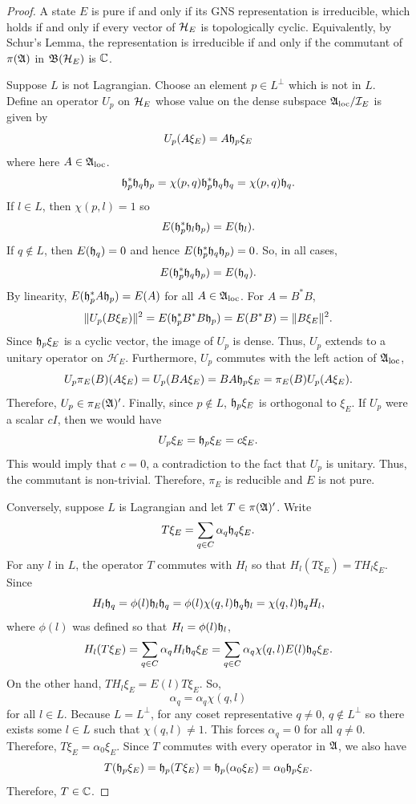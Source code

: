 \documentclass[11pt]{amsart}
\begin{document}
\begin{proof}
A state $E$ is pure if and only if its GNS representation is irreducible, which holds if and only if every vector of $\mathcal{H}_E$ is topologically cyclic. Equivalently, by Schur's Lemma, the representation is irreducible if and only if the commutant of $\pi(\mathfrak{A})$ in $\mathfrak{B}(\mathcal{H}_E)$ is $\mathbb{C}$.


Suppose $L$ is not Lagrangian. Choose an element $p \in L^\perp$ which is not in $L$. Define an operator $U_p$ on $\mathcal{H}_E$ whose value on the dense subspace $\mathfrak{A}_{\mathrm{loc}}/\mathcal{I}_E$ is given by
\[
U_p (A \xi_E) = A \mathfrak{h}_p \xi_E
\]
where here $A \in \mathfrak{A}_{\mathrm{loc}}$.
\[\mathfrak{h}_p^* \mathfrak{h}_q \mathfrak{h}_p = \chi(p, q) \mathfrak{h}_p^*\mathfrak{h}_q\mathfrak{h}_q = \chi(p, q)\mathfrak{h}_q .\]
If $l\in L$, then $ \chi(p, l)=1$ so
\[E(\mathfrak{h}_p^* \mathfrak{h}_l \mathfrak{h}_p  )=E(\mathfrak{h}_l).\]
If $q\not\in L$, then $ E(\mathfrak{h}_q)= 0$ and hence
$E(\mathfrak{h}_p^* \mathfrak{h}_q \mathfrak{h}_p )  = 0$.
So, in all cases,
\[ E(\mathfrak{h}_p^* \mathfrak{h}_q \mathfrak{h}_p) = E(\mathfrak{h}_q).\]
By linearity, $E(\mathfrak{h}_p^* A \mathfrak{h}_p) = E(A)$ for all $A\in \mathfrak{A}_{\mathrm{loc}}$. For $A = B^* B$,
\[
\lVert U_p (B \xi_E) \rVert^2 = E(\mathfrak{h}_p^* B^* B \mathfrak{h}_p) = E(B^* B) = \lVert B \xi_E \rVert^2.
\]
Since $\mathfrak{h}_p \xi_E$ is a cyclic vector, the image of $U_p$ is dense.
Thus, $U_p$ extends to a unitary operator on $\mathcal{H}_E$.
Furthermore, $U_p$ commutes with the left action of $\mathfrak{A}_{\mathrm{loc}}$,
\[
U_p \pi_E(B) (A \xi_E) = U_p (B A \xi_E) = B A \mathfrak{h}_p \xi_E = \pi_E(B) U_p (A \xi_E).
\]
Therefore, $U_p \in \pi_E(\mathfrak{A})'$. Finally, since $p \notin L$, $\mathfrak{h}_p \xi_E$ is orthogonal to $\xi_E$. If $U_p$ were a scalar $c I$, then we would have
\[U_p \xi_E = \mathfrak{h}_p \xi_E = c \xi_E .\]
This would imply that $c=0$, a contradiction to the fact that $U_p$ is unitary. Thus, the commutant is non-trivial. Therefore, $\pi_E$ is reducible and $E$ is not pure.


Conversely, suppose $L$ is Lagrangian and let $T \in \pi(\mathfrak{A})'$. Write
\[
T\xi_E = \sum_{q \in C} \alpha_q \mathfrak{h}_q \xi_E.
\]
For any $l$ in $L$, the operator $T$ commutes with $H_l$ so that $H_l(T\xi_E)  = TH_l\xi_E$.
Since
\[H_l \mathfrak{h}_q = \phi(l)\mathfrak{h}_l\mathfrak{h}_q = \phi(l) \chi(q,l) \mathfrak{h}_q \mathfrak{h}_l = \chi(q,l) \mathfrak{h}_qH_l,\]
where $\phi(l)$ was defined so that $H_l = \phi(l) \mathfrak{h}_l$,
\[
H_l(T\xi_E) = \sum_{q \in C} \alpha_q H_l \mathfrak{h}_q \xi_E = \sum_{q \in C} \alpha_q \chi(q,l) E(l) \mathfrak{h}_q \xi_E.
\]
On the other hand, $TH_l\xi_E = E(l)T\xi_E$. So,
\[\alpha_q = \alpha_q \chi(q,l)\]
for all $l \in L$. Because $L = L^\perp$, for any coset representative $q \neq 0$, $q\not\in L^\perp$ so there exists some $l \in L$ such that $\chi(q,l) \neq 1$. This forces  $\alpha_q = 0$ for all $q \neq 0$. Therefore, $T\xi_E = \alpha_0 \xi_E$. Since $T$ commutes with every operator in $\mathfrak{A}$, we also have
\[
T(\mathfrak{h}_p \xi_E) = \mathfrak{h}_p (T\xi_E) = \mathfrak{h}_p (\alpha_0 \xi_E) = \alpha_0 \mathfrak{h}_p \xi_E.
\]
Therefore, $T\in \mathbb{C}$.
\end{proof}
\end{document}
